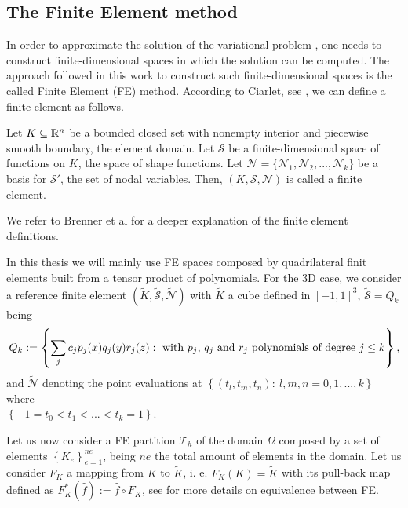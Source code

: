 \subsection{The Finite Element method}
\label{subsec-variational_finite_element}
In order to approximate the solution of the variational problem , one needs to construct finite-dimensional spaces in which the solution can be computed. The approach followed in this work to construct such finite-dimensional spaces is the called Finite Element (FE) method. According to Ciarlet, see \cite{ciarlet_finite_1978}, we can define a finite element as follows.

Let $ K\subseteq\mathbb{R}^n $ be a bounded closed set with nonempty interior and piecewise smooth boundary, the element domain. Let $ \mathcal{S} $ be a finite-dimensional space of functions on $ K $, the space of shape functions. Let $ \mathcal{N}=\{\mathcal{N}_1,\mathcal{N}_2,...,\mathcal{N}_k\} $ be a basis for $ \mathcal{S}' $, the set of nodal variables. Then, $ (K,\mathcal{S},\mathcal{N}) $ is called a finite element.

We refer to Brenner et al \cite{brenner_mathematical_2007} for a deeper explanation of the finite element definitions.

In this thesis we will mainly use FE spaces composed by quadrilateral finit elements built from a tensor product of polynomials. For the 3D case, we consider a reference finite element $ (\widetilde{K},\widetilde{\mathcal{S}},\widetilde{\mathcal{N}}) $ with $ \widetilde{K} $ a cube defined in $ [-1,1]^3 $, $ \widetilde{\mathcal{S}}=Q_k $ being
$$ Q_k:=\left\{\sum_jc_jp_j(x)q_j(y)r_j(z):\mbox{ with $ p_j $, $ q_j $ and $ r_j $ polynomials of degree $j \leq k $}\right\}, $$
and $ \widetilde{\mathcal{N}} $ denoting the point evaluations at $ \left\{(t_l,t_m,t_n):\ l,m,n=0,1,...,k \right\} $ where \\$\left\{-1 = t_0 < t_1 < ... < t_k = 1 \right\}$.

Let us now consider a FE partition $ \mathcal{T}_h $ of the domain $ \Omega $ composed by a set of elements $ \left\{K_e\right\}_{e=1}^{ne} $, being $ ne $ the total amount of elements in the domain. Let us consider $ F_K $ a mapping from $ K $ to $ \widetilde{K} $, i. e. $ F_K(K)=\widetilde{K} $ with its pull-back map defined as $ F^*_K(\hat{f}):=\hat{f}\circ F_K $, see \cite{ciarlet_general_1972,brenner_mathematical_2007} for more details on equivalence between FE.

